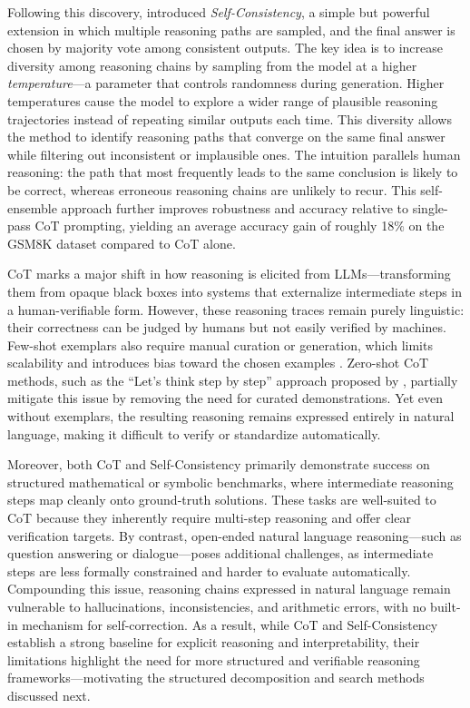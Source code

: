 \documentclass[project]{bsu-cs}  %
\begin{document}
Following this discovery, \citet{wang2023selfconsistencyimproveschainthought} introduced \textit{Self-Consistency}, a simple but powerful extension in which multiple reasoning paths are sampled, and the final answer is chosen by majority vote among consistent outputs. The key idea is to increase diversity among reasoning chains by sampling from the model at a higher \textit{temperature}—a parameter that controls randomness during generation. Higher temperatures cause the model to explore a wider range of plausible reasoning trajectories instead of repeating similar outputs each time. This diversity allows the method to identify reasoning paths that converge on the same final answer while filtering out inconsistent or implausible ones. The intuition parallels human reasoning: the path that most frequently leads to the same conclusion is likely to be correct, whereas erroneous reasoning chains are unlikely to recur. This self-ensemble approach further improves robustness and accuracy relative to single-pass CoT prompting, yielding an average accuracy gain of roughly 18\% on the GSM8K dataset compared to CoT alone.

CoT marks a major shift in how reasoning is elicited from LLMs—transforming them from opaque black boxes into systems that externalize intermediate steps in a human-verifiable form. However, these reasoning traces remain purely linguistic: their correctness can be judged by humans but not easily verified by machines. Few-shot exemplars also require manual curation or generation, which limits scalability and introduces bias toward the chosen examples \citep{zhao2021calibrateuseimprovingfewshot}. Zero-shot CoT methods, such as the “Let’s think step by step” approach proposed by \citet{kojima2023largelanguagemodelszeroshot}, partially mitigate this issue by removing the need for curated demonstrations. Yet even without exemplars, the resulting reasoning remains expressed entirely in natural language, making it difficult to verify or standardize automatically.

Moreover, both CoT and Self-Consistency primarily demonstrate success on structured mathematical or symbolic benchmarks, where intermediate reasoning steps map cleanly onto ground-truth solutions. These tasks are well-suited to CoT because they inherently require multi-step reasoning and offer clear verification targets. By contrast, open-ended natural language reasoning—such as question answering or dialogue—poses additional challenges, as intermediate steps are less formally constrained and harder to evaluate automatically. Compounding this issue, reasoning chains expressed in natural language remain vulnerable to hallucinations, inconsistencies, and arithmetic errors, with no built-in mechanism for self-correction. As a result, while CoT and Self-Consistency establish a strong baseline for explicit reasoning and interpretability, their limitations highlight the need for more structured and verifiable reasoning frameworks—motivating the structured decomposition and search methods discussed next.
% 
%
%
% 
\end{document}
